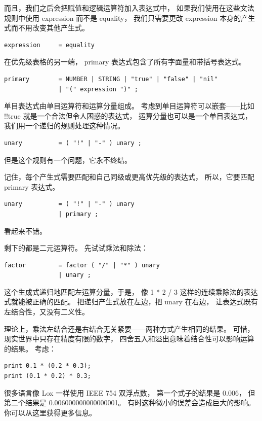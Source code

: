 \documentclass[cn,10pt,math=newtx,citestyle=gb7714-2015,bibstyle=gb7714-2015]{elegantbook}
\begin{document}
而且，我们之后会把赋值和逻辑运算符加入表达式中， 如果我们使用在这些文法规则中使用 expression 而不是 equality， 我们只需要更改 expression 本身的产生式而不用改变其他产生式。

\begin{verbatim}
expression     = equality
\end{verbatim}

在优先级表格的另一端， primary 表达式包含了所有字面量和带括号表达式。

\begin{verbatim}
primary        = NUMBER | STRING | "true" | "false" | "nil"
               | "(" expression ")" ;
\end{verbatim}

单目表达式由单目运算符和运算分量组成。 考虑到单目运算符可以嵌套——比如 !!true 就是一个合法但令人困惑的表达式， 运算分量也可以是一个单目表达式，我们用一个递归的规则处理这种情况。

\begin{verbatim}
unary          = ( "!" | "-" ) unary ;
\end{verbatim}

但是这个规则有一个问题，它永不终结。

记住，每个产生式需要匹配和自己同级或更高优先级的表达式， 所以，它要匹配 primary 表达式。

\begin{verbatim}
unary          = ( "!" | "-" ) unary
               | primary ;
\end{verbatim}

看起来不错。

剩下的都是二元运算符。 先试试乘法和除法：

\begin{verbatim}
factor         = factor ( "/" | "*" ) unary
               | unary ;
\end{verbatim}

这个生成式递归地匹配左运算分量，于是， 像 1 * 2 / 3 这样的连续乘除法的表达式就能被正确的匹配。 把递归产生式放在左边，把 unary 在右边， 让表达式既有左结合性，又没有二义性。

理论上，乘法左结合还是右结合无关紧要——两种方式产生相同的结果。 可惜，现实世界中只存在精度有限的数字， 四舍五入和溢出意味着结合性可以影响运算的结果。 考虑：

\begin{verbatim}
print 0.1 * (0.2 * 0.3);
print (0.1 * 0.2) * 0.3;
\end{verbatim}

很多语言像 Lox 一样使用 IEEE 754 双浮点数， 第一个式子的结果是 0.006， 但第二个结果是 0.006000000000000001。 有时这种微小的误差会造成巨大的影响。你可以从这里获得更多信息。
\end{document}
